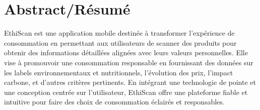 \section*{Abstract/Résumé}
EthiScan est une application mobile destinée à transformer l'expérience de consommation en permettant aux utilisateurs de scanner des produits pour obtenir des informations détaillées alignées avec leurs valeurs personnelles. Elle vise à promouvoir une consommation responsable en fournissant des données sur les labels environnementaux et nutritionnels, l'évolution des prix, l'impact carbone, et d'autres critères pertinents. En intégrant une technologie de pointe et une conception centrée sur l'utilisateur, EthiScan offre une plateforme fiable et intuitive pour faire des choix de consommation éclairés et responsables.